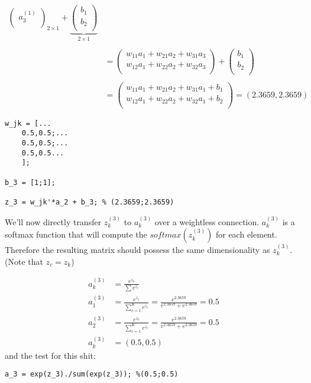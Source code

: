 \documentclass{article}
\begin{document}
\begin{align*}
{\begin{pmatrix}
        a^{(1)}_3 \\
    \end{pmatrix}
    }_{2\times 1}
    +
    \underbrace{
    \begin{pmatrix}
        b_1 \\
        b_2 \\
    \end{pmatrix}
    }_{2\times 1}\\ \\
    &=
    \begin{pmatrix}
        w_{11}a_1 + w_{21}a_2 + w_{31}a_3 \\
        w_{12}a_1 + w_{22}a_2 + w_{32}a_3 \\
    \end{pmatrix}
    +
    \begin{pmatrix}
        b_1\\
        b_2\\
    \end{pmatrix}\\ \\
    &=
    \begin{pmatrix}
        w_{11}a_1 + w_{21}a_2 + w_{31}a_1 + b_1\\
        w_{12}a_1 + w_{22}a_2 + w_{32}a_1 + b_2\\
    \end{pmatrix}
     = (2.3659,2.3659)
\end{align*}

\begin{lstlisting}[style=matlab, label=your-label]
w_jk = [...
    0.5,0.5;...
    0.5,0.5;...
    0.5,0.5...
    ];

b_3 = [1;1];

z_3 = w_jk'*a_2 + b_3; % (2.3659;2.3659)
\end{lstlisting}


We'll now directly transfer $z_k^{(3)}$ to $a_k^{(3)}$ over a weightless connection. $a_k^{(3)}$ is a softmax function that will compute the $softmax(z_k^{(3)})$ for each element. Therefore the resulting matrix should possess the same dimensionality as $z^{(3)}_k$. (Note that $z_c = z_k$)

\begin{align*}
    a_k^{(3)} & = \frac{e^{z_k}}{\sum e^{z_c}}\\
    a_1^{(3)} &= \frac{e^{z_1}}{\sum_{c=1}^K e^{z_c}} = \frac{e^{2.3659}}{e^{2.3659}+e^{2.3659}} = 0.5\\
    a_2^{(3)} &= \frac{e^{z_2}}{\sum_{c=1}^K e^{z_c}} = \frac{e^{2.3659}}{e^{2.3659}+e^{2.3659}}=0.5\\
    a_k^{(3)} &= (0.5,0.5)
\end{align*}
and the test for this shit:
\begin{lstlisting}[style=matlab, label=your-label]
a_3 = exp(z_3)./sum(exp(z_3)); %(0.5;0.5)
\end{lstlisting}
\end{document}
